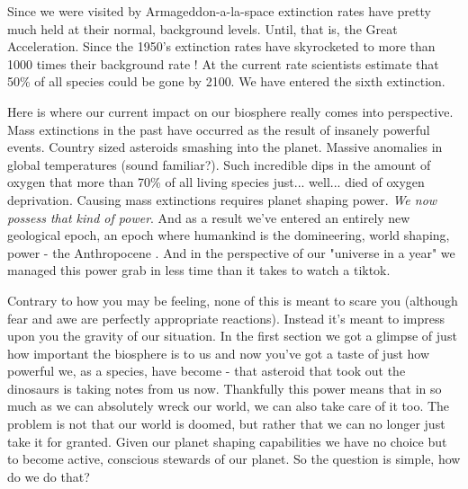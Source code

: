 \documentclass[11pt]{book}
\begin{document}
Since we were visited by Armageddon-a-la-space extinction rates have pretty much held at their normal, background levels. Until, that is, the Great Acceleration. Since the 1950's extinction rates have skyrocketed to more than 1000 times their background rate \cite{wwf}! At the current rate scientists estimate that 50\% of all species could be gone by 2100. We have entered the sixth extinction. 

Here is where our current impact on our biosphere really comes into perspective. Mass extinctions in the past have occurred as the result of insanely powerful events. Country sized asteroids smashing into the planet. Massive anomalies in global temperatures (sound familiar?). Such incredible dips in the amount of oxygen that more than 70\% of all living species just... well... died of oxygen deprivation. Causing mass extinctions requires planet shaping power. \textit{We now possess that kind of power}. And as a result we've entered an entirely new geological epoch, an epoch where humankind is the domineering, world shaping, power - the Anthropocene \cite{eellis}. And in the perspective of our "universe in a year" we managed this power grab in less time than it takes to watch a tiktok.
\newline

Contrary to how you may be feeling, none of this is meant to scare you (although fear and awe are perfectly appropriate reactions). Instead it's meant to impress upon you the gravity of our situation. In the first section we got a glimpse of just how important the biosphere is to us and now you've got a taste of just how powerful we, as a species, have become - that asteroid that took out the dinosaurs is taking notes from us now. Thankfully this power means that in so much as we can absolutely wreck our world, we can also take care of it too. The problem is not that our world is doomed, but rather that we can no longer just take it for granted. Given our planet shaping capabilities we have no choice but to become active, conscious stewards of our planet. So the question is simple, how do we do that?
\end{document}
